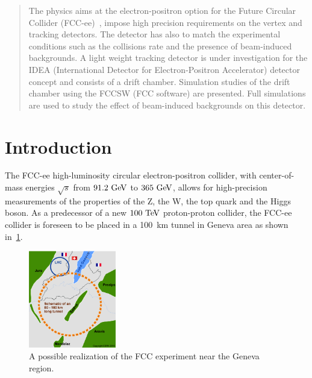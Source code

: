 \documentclass[conference]{IEEEtran}
\begin{document}




\maketitle
\thispagestyle{plain}
\pagestyle{plain}

\begin{abstract}
The physics aims at the electron-positron option for  the Future Circular Collider (FCC-ee)~\cite{Gomez-Ceballos:2013zzn}, impose high precision requirements on the vertex and tracking detectors.  The detector has also to match the experimental conditions such as the collisions rate and the presence of beam-induced backgrounds.
A light weight tracking detector is under investigation for the IDEA (International Detector for Electron-Positron Accelerator) detector concept and consists of a drift chamber. Simulation studies of the drift chamber using the FCCSW (FCC software) are presented. Full simulations are used to study the effect of beam-induced backgrounds on this detector.

\end{abstract}

\IEEEpeerreviewmaketitle


\section{Introduction}
The FCC-ee high-luminosity circular electron-positron collider, with center-of-mass energies $\sqrt{s}$ from $91.2\,\mathrm{\,Ge\kern -0.1em V}$ to
$365\,\mathrm{\,Ge\kern -0.1em V}$, allows for high-precision measurements of the properties of the Z, the W, the top quark and the Higgs boson. As a predecessor of a new $100\,\mathrm{\,Te\kern -0.1em V}$ proton-proton collider, the FCC-ee collider is foreseen to be placed in a 100~km tunnel in Geneva area as shown in~\cref{fig_fcc_cern}.

\begin{figure}[!h]
	\centering
	\includegraphics[width=1.5in]{Poster/Figures/cernFCC.jpg}%
	\caption{A possible realization of the FCC experiment near the Geneva region.}
	\label{fig_fcc_cern}
\end{figure}
\end{document}
